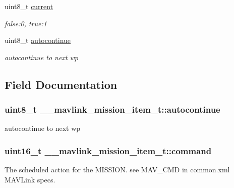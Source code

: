 \begin{DoxyCompactItemize}
uint8\+\_\+t \hyperlink{struct____mavlink__mission__item__t_aa9fdaa647214fcb6bb21e05f2718f56f}{current}
\begin{DoxyCompactList}\small\item\em false\+:0, true\+:1 \end{DoxyCompactList}\item 
uint8\+\_\+t \hyperlink{struct____mavlink__mission__item__t_a2f276d223a22308aed2978c1718bf74f}{autocontinue}
\begin{DoxyCompactList}\small\item\em autocontinue to next wp \end{DoxyCompactList}\end{DoxyCompactItemize}


\subsection{Field Documentation}
\hypertarget{struct____mavlink__mission__item__t_a2f276d223a22308aed2978c1718bf74f}{
\subsubsection[{autocontinue}]{\setlength{\rightskip}{0pt plus 5cm}uint8\+\_\+t \+\_\+\+\_\+mavlink\+\_\+mission\+\_\+item\+\_\+t\+::autocontinue}}\label{struct____mavlink__mission__item__t_a2f276d223a22308aed2978c1718bf74f}


autocontinue to next wp 

\hypertarget{struct____mavlink__mission__item__t_ad5a94a67caa147049e45c3754f15daa7}{
\subsubsection[{command}]{\setlength{\rightskip}{0pt plus 5cm}uint16\+\_\+t \+\_\+\+\_\+mavlink\+\_\+mission\+\_\+item\+\_\+t\+::command}}\label{struct____mavlink__mission__item__t_ad5a94a67caa147049e45c3754f15daa7}


The scheduled action for the M\+I\+S\+S\+I\+O\+N. see M\+A\+V\+\_\+\+C\+M\+D in common.\+xml M\+A\+V\+Link specs. 

